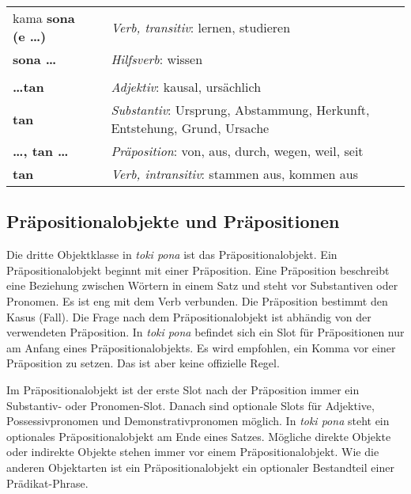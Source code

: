 \begin{supertabular}{p{2,5cm}|ll}
kama \textbf{sona (e \dots)} && \textit{Verb, transitiv}: lernen, studieren \\ %
\textbf{sona \dots} && \textit{Hilfsverb}: wissen \\ %
 && \\ %
%
\textbf{\dots tan} && \textit{Adjektiv}: kausal, ursächlich \\ %
\textbf{tan} && \textit{Substantiv}: Ursprung, Abstammung, Herkunft, Entstehung, Grund, Ursache \\ %
\textbf{\dots , tan \dots} && \textit{Präposition}: von, aus, durch, wegen, weil, seit \\ %
\textbf{tan} && \textit{Verb, intransitiv}: stammen aus, kommen aus \\ %
\end{supertabular}
%
\newpage
%
\subsection*{Präpositionalobjekte und Präpositionen}
%

Die dritte Objektklasse in \textit{toki pona} ist das Präpositionalobjekt. 
Ein Präpositionalobjekt beginnt mit einer Präposition. 
Eine Präposition beschreibt eine Beziehung zwischen Wörtern in einem Satz und steht vor Substantiven oder Pronomen. 
Es ist eng mit dem Verb verbunden. 
Die Präposition bestimmt den Kasus (Fall). 
Die Frage nach dem Präpositionalobjekt ist abhändig von der verwendeten Präposition. 
In \textit{toki pona} befindet sich ein Slot für Präpositionen nur am Anfang eines Präpositionalobjekts. 
Es wird empfohlen, ein Komma vor einer Präposition zu setzen. 
Das ist aber keine offizielle Regel. 

Im Präpositionalobjekt ist der erste Slot nach der Präposition immer ein Substantiv- oder Pronomen-Slot.
Danach sind optionale Slots für Adjektive, Possessivpronomen und Demonstrativpronomen möglich. 
In \textit{toki pona} steht ein optionales Präpositionalobjekt am Ende eines Satzes. 
Mögliche direkte Objekte oder indirekte Objekte stehen immer vor einem Präpositionalobjekt. 
Wie die anderen Objektarten ist ein Präpositionalobjekt ein optionaler Bestandteil einer Prädikat-Phrase. 

